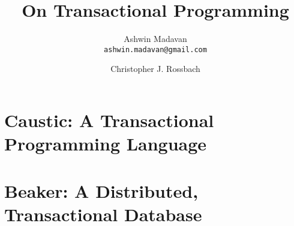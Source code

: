 \documentclass[12pt]{report}
\begin{document}
\title{On Transactional Programming\vspace{-2ex}}
\author{
  Ashwin Madavan\\
  \texttt{ashwin.madavan@gmail.com}
  \and
  Christopher J. Rossbach\\
}
\maketitle



\tableofcontents

\chapter{Caustic: A Transactional Programming Language}


\chapter{Beaker: A Distributed, Transactional Database}


\printbibliography
\end{document}
